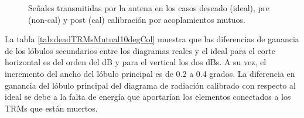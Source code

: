 \begin{figure}[H]
	\centering

	\caption{Señales transmitidas por la antena en los casos deseado (ideal), pre (non-cal) y post (cal) calibración por acoplamientos mutuos.}
	\label{fig:deadTRMsMutual10degCol}
\end{figure}

La tabla \ref{tab:deadTRMsMutual10degCol} muestra que las diferencias de ganancia de los lóbulos secundarios entre los diagramas 
reales y el ideal para el corte horizontal es del orden del dB y para el vertical los dos dBs. A su vez, el incremento del ancho del 
lóbulo principal es de 0.2 a 0.4 grados. La diferencia en ganancia del lóbulo principal del diagrama de radiación calibrado 
con respecto al ideal se debe a la falta de energía que aportarían los elementos conectados a los TRMs que están muertos.

